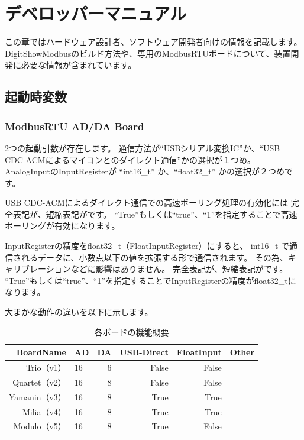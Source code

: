 \chapter{デベロッパーマニュアル}
この章ではハードウェア設計者、ソフトウェア開発者向けの情報を記載します。
DigitShowModbusのビルド方法や、専用のModbusRTUボードについて、装置開発に必要な情報が含まれています。

\section{起動時変数}
\label{sec:startup_variable_developer}
\subsection{ModbusRTU AD/DA Board}

2つの起動引数が存在します。
通信方法が``USBシリアル変換IC''か、``USB CDC-ACMによるマイコンとのダイレクト通信''かの選択が１つめ。
AnalogInputのInputRegisterが ``int16\_t'' か、``float32\_t'' かの選択が２つめです。

USB CDC-ACMによるダイレクト通信での高速ポーリング処理の有効化には
完全表記が、短縮表記がです。
``True''もしくは``true''、``1''を指定することで高速ポーリングが有効になります。

InputRegisterの精度をfloat32\_t（FloatInputRegister）にすると、
int16\_t で通信されるデータに、小数点以下の値を拡張する形で通信されます。
その為、キャリブレーションなどに影響はありません。
完全表記が、短縮表記がです。
``True''もしくは``true''、``1''を指定することでInputRegisterの精度がfloat32\_tになります。

大まかな動作の違いを以下に示します。
\begin{table}[htbp]
    \centering
    \caption{各ボードの機能概要}
    \begin{tabular}{rlrrrr}
        \toprule
        BoardName & AD & DA & USB-Direct & FloatInput & Other \\ \midrule
        Trio（v1） & 16 & 6 & False & False  & \\
        Quartet（v2） & 16 & 8 & False & False & \\
        Yamanin（v3） & 16 & 8 & True & True & \\
        Milia（v4） & 16 & 8 & True & True & \\
        Modulo（v5） & 16 & 8 & True & False & \\ \bottomrule
    \end{tabular}
    \label{tab:board_version}
\end{table}

